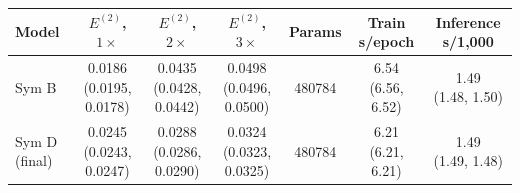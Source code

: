 \begin{tabular}{@{}lcccccc@{}}
\toprule
Model & $E^{(2)}$, $1\times$ & $E^{(2)}$, $2\times$ & $E^{(2)}$, $3\times$ & Params & Train s/epoch & Inference s/1,000 \\
\midrule
Sym B & \shortstack{0.0186\\[-1pt](0.0195, 0.0178)} & \shortstack{0.0435\\[-1pt](0.0428, 0.0442)} & \shortstack{0.0498\\[-1pt](0.0496, 0.0500)} & 480784 & \shortstack{6.54\\[-1pt](6.56, 6.52)} & \shortstack{1.49\\[-1pt](1.48, 1.50)} \\
Sym D (final) & \shortstack{0.0245\\[-1pt](0.0243, 0.0247)} & \shortstack{0.0288\\[-1pt](0.0286, 0.0290)} & \shortstack{0.0324\\[-1pt](0.0323, 0.0325)} & 480784 & \shortstack{6.21\\[-1pt](6.21, 6.21)} & \shortstack{1.49\\[-1pt](1.49, 1.48)} \\
\bottomrule
\end{tabular}\par\endgroup\vspace{5pt}
